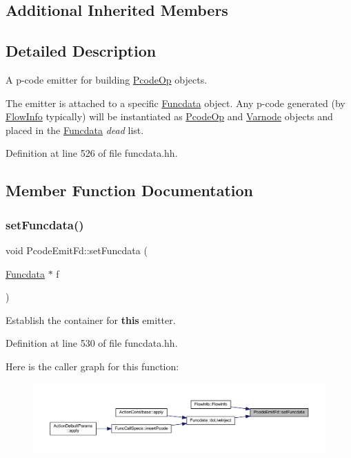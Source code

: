 \subsection*{Additional Inherited Members}


\subsection{Detailed Description}
A p-\/code emitter for building \mbox{\hyperlink{class_pcode_op}{Pcode\+Op}} objects. 

The emitter is attached to a specific \mbox{\hyperlink{class_funcdata}{Funcdata}} object. Any p-\/code generated (by \mbox{\hyperlink{class_flow_info}{Flow\+Info}} typically) will be instantiated as \mbox{\hyperlink{class_pcode_op}{Pcode\+Op}} and \mbox{\hyperlink{class_varnode}{Varnode}} objects and placed in the \mbox{\hyperlink{class_funcdata}{Funcdata}} {\itshape dead} list. 

Definition at line 526 of file funcdata.\+hh.



\subsection{Member Function Documentation}
\mbox{\label{class_pcode_emit_fd_ae05c7896ce87a2b2cddb2e9ec78c06aa}} 
\subsubsection{\texorpdfstring{setFuncdata()}{setFuncdata()}}
{\footnotesize\ttfamily void Pcode\+Emit\+Fd\+::set\+Funcdata (\begin{DoxyParamCaption}\item[{\mbox{\hyperlink{class_funcdata}{Funcdata}} $\ast$}]{f }\end{DoxyParamCaption})\hspace{0.3cm}{\ttfamily [inline]}}



Establish the container for {\bfseries{this}} emitter. 



Definition at line 530 of file funcdata.\+hh.

Here is the caller graph for this function\+:
\nopagebreak
\begin{figure}[H]
\begin{center}
\leavevmode
\includegraphics[width=350pt]{class_pcode_emit_fd_ae05c7896ce87a2b2cddb2e9ec78c06aa_icgraph}
\end{center}
\end{figure}


